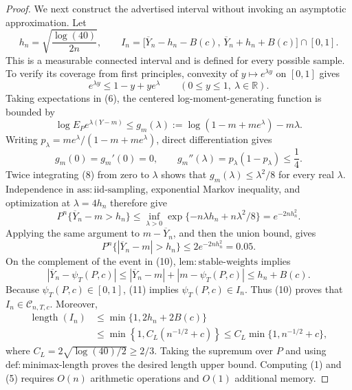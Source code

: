 \documentclass{article}
\begin{document}
\begin{proof}
We next construct the advertised interval without invoking an asymptotic approximation.  Let
\[
h_n=\sqrt{\frac{\log(40)}{2n}},
\qquad
I_n=\bigl[\overline Y_n-h_n-B(c),\,\overline Y_n+h_n+B(c)\bigr]\cap[0,1].
\tag{5}
\]
This is a measurable connected interval and is defined for every possible sample.  To verify its coverage from first principles, convexity of \(y\mapsto e^{\lambda y}\) on \([0,1]\) gives
\[
e^{\lambda y}\leq1-y+ye^\lambda
\qquad(0\leq y\leq1,\ \lambda\in\mathbb R).
\tag{6}
\]
Taking expectations in (6), the centered log-moment-generating function is bounded by
\[
\log E_Pe^{\lambda(Y-m)}
\leq g_m(\lambda)
:=\log(1-m+me^\lambda)-m\lambda.
\tag{7}
\]
Writing \(p_\lambda=me^\lambda/(1-m+me^\lambda)\), direct differentiation gives
\[
g_m(0)=g_m'(0)=0,
\qquad
g_m''(\lambda)=p_\lambda(1-p_\lambda)\leq\frac14.
\tag{8}
\]
Twice integrating (8) from zero to \(\lambda\) shows that \(g_m(\lambda)\leq\lambda^2/8\) for every real \(\lambda\).  Independence in \(\mathrm{ass:iid\text{-}sampling}\), exponential Markov inequality, and optimization at \(\lambda=4h_n\) therefore give
\[
P^n\{\overline Y_n-m>h_n\}
\leq\inf_{\lambda>0}\exp\{-n\lambda h_n+n\lambda^2/8\}
=e^{-2nh_n^2}.
\tag{9}
\]
Applying the same argument to \(m-\overline Y_n\), and then the union bound, gives
\[
P^n\{|\overline Y_n-m|>h_n\}
\leq2e^{-2nh_n^2}=0.05.
\tag{10}
\]
On the complement of the event in (10), \(\mathrm{lem:stable\text{-}weights}\) implies
\[
|\overline Y_n-\psi_T(P,c)|
\leq|\overline Y_n-m|+|m-\psi_T(P,c)|
\leq h_n+B(c).
\tag{11}
\]
Because \(\psi_T(P,c)\in[0,1]\), (11) implies \(\psi_T(P,c)\in I_n\).  Thus (10) proves that \(I_n\in\mathcal C_{n,T,c}\).  Moreover,
\[
\begin{aligned}
\operatorname{length}(I_n)
&\leq\min\{1,2h_n+2B(c)\}\\
&\leq\min\!\left\{1,C_L(n^{-1/2}+c)\right\}
\leq C_L\min\{1,n^{-1/2}+c\},
\end{aligned}
\tag{12}
\]
where \(C_L=2\sqrt{\log(40)/2}\geq2/3\).  Taking the supremum over \(P\) and using \(\mathrm{def:minimax\text{-}length}\) proves the desired length upper bound.  Computing (1) and (5) requires \(O(n)\) arithmetic operations and \(O(1)\) additional memory.


\end{proof}
\end{document}
